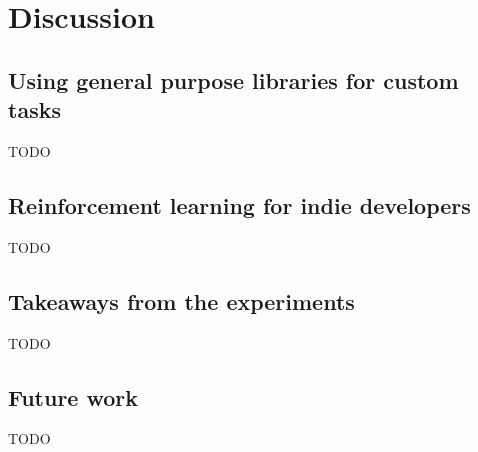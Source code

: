 \chapter{Discussion}
\label{ch:discussion}


\section{Using general purpose libraries for custom tasks}
\label{sec:discussion-library_support}

TODO


\section{Reinforcement learning for indie developers}
\label{sec:discussion-rl_for_indie}

TODO


\section{Takeaways from the experiments}
\label{sec:discussion-takeaways}

TODO


\section{Future work}
\label{sec:discussion-future_work}

TODO